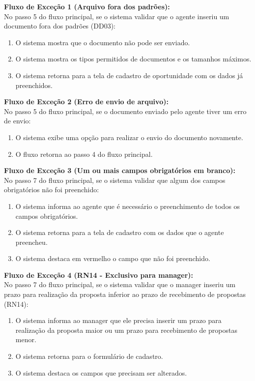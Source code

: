 \noindent\textbf{Fluxo de Exceção 1 (Arquivo fora dos padrões):}\\
No passo 5 do fluxo principal, se o sistema validar que o agente inseriu um documento fora dos padrões (DD03):
\begin{enumerate}[noitemsep, topsep=-5pt, parsep=0pt]
    \item O sistema mostra que o documento não pode ser enviado.
    \item O sistema mostra os tipos permitidos de documentos e os tamanhos máximos.
    \item O sistema retorna para a tela de cadastro de oportunidade com os dados já preenchidos.
\end{enumerate}

\noindent\textbf{Fluxo de Exceção 2 (Erro de envio de arquivo):}\\
No passo 5 do fluxo principal, se o documento enviado pelo agente tiver um erro de envio:
\begin{enumerate}[noitemsep, topsep=-5pt, parsep=0pt]
    \item O sistema exibe uma opção para realizar o envio do documento novamente.
    \item O fluxo retorna ao passo 4 do fluxo principal.
\end{enumerate}

\noindent\textbf{Fluxo de Exceção 3 (Um ou mais campos obrigatórios em branco):}\\
No passo 7 do fluxo principal, se o sistema validar que algum dos campos obrigatórios não foi preenchido:
\begin{enumerate}[noitemsep, topsep=-5pt, parsep=0pt]
    \item O sistema informa ao agente que é necessário o preenchimento de todos os campos obrigatórios.
    \item O sistema retorna para a tela de cadastro com os dados que o agente preencheu.
    \item O sistema destaca em vermelho o campo que não foi preenchido.
\end{enumerate}

\noindent\textbf{Fluxo de Exceção 4 (RN14 - Exclusivo para manager):}\\
No passo 7 do fluxo principal, se o sistema validar que o manager inseriu um prazo para realização da proposta inferior ao prazo de recebimento de propostas (RN14):
\begin{enumerate}[noitemsep, topsep=-5pt, parsep=0pt]
    \item O sistema informa ao manager que ele precisa inserir um prazo para realização da proposta maior ou um prazo para recebimento de propostas menor.
    \item O sistema retorna para o formulário de cadastro.
    \item O sistema destaca os campos que precisam ser alterados.
\end{enumerate}

